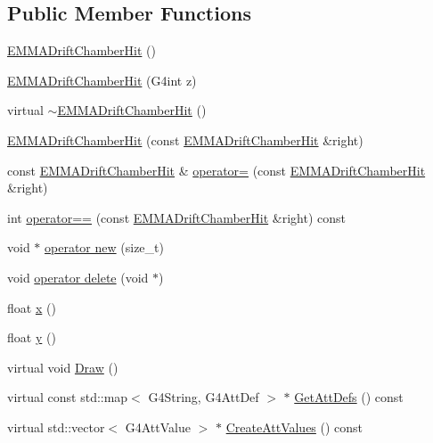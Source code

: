 \subsection*{Public Member Functions}
\begin{DoxyCompactItemize}
\item 
\hyperlink{classEMMADriftChamberHit_a594c8e260fee279b749157d4b9cf1ca5}{E\+M\+M\+A\+Drift\+Chamber\+Hit} ()
\item 
\hyperlink{classEMMADriftChamberHit_aaef952a2723be15703ead516c6ee1a7e}{E\+M\+M\+A\+Drift\+Chamber\+Hit} (G4int z)
\item 
virtual \hyperlink{classEMMADriftChamberHit_abf1b5fc314c3dc7761c90083c72ccbc5}{$\sim$\+E\+M\+M\+A\+Drift\+Chamber\+Hit} ()
\item 
\hyperlink{classEMMADriftChamberHit_a336128054e27191099186780926d6961}{E\+M\+M\+A\+Drift\+Chamber\+Hit} (const \hyperlink{classEMMADriftChamberHit}{E\+M\+M\+A\+Drift\+Chamber\+Hit} \&right)
\item 
const \hyperlink{classEMMADriftChamberHit}{E\+M\+M\+A\+Drift\+Chamber\+Hit} \& \hyperlink{classEMMADriftChamberHit_a6cbcdf5f9534301edee59597856e10fc}{operator=} (const \hyperlink{classEMMADriftChamberHit}{E\+M\+M\+A\+Drift\+Chamber\+Hit} \&right)
\item 
int \hyperlink{classEMMADriftChamberHit_a4c00fa9d1a0ea9237e9b1e94b3022e2b}{operator==} (const \hyperlink{classEMMADriftChamberHit}{E\+M\+M\+A\+Drift\+Chamber\+Hit} \&right) const 
\item 
void $\ast$ \hyperlink{classEMMADriftChamberHit_a9775aef5153605acf6b4ba1584e78b68}{operator new} (size\+\_\+t)
\item 
void \hyperlink{classEMMADriftChamberHit_a327d8eda9ffe3c466aa6c5375fb8b1bc}{operator delete} (void $\ast$)
\item 
float \hyperlink{classEMMADriftChamberHit_ac55f7e4ec4ab486310fe9e8a43784fec}{x} ()
\item 
float \hyperlink{classEMMADriftChamberHit_afd5a3604f426ac37b58ac2cae1cecba8}{y} ()
\item 
virtual void \hyperlink{classEMMADriftChamberHit_ab5c31e999289cfcfb220db6e76f51d9d}{Draw} ()
\item 
virtual const std\+::map$<$ G4\+String, G4\+Att\+Def $>$ $\ast$ \hyperlink{classEMMADriftChamberHit_a6fc59cd913a749f9deef6abd412a5710}{Get\+Att\+Defs} () const 
\item 
virtual std\+::vector$<$ G4\+Att\+Value $>$ $\ast$ \hyperlink{classEMMADriftChamberHit_a5b24dc1d921c6bbdb6e7dc6028a1abc9}{Create\+Att\+Values} () const 

\end{DoxyCompactItemize}
